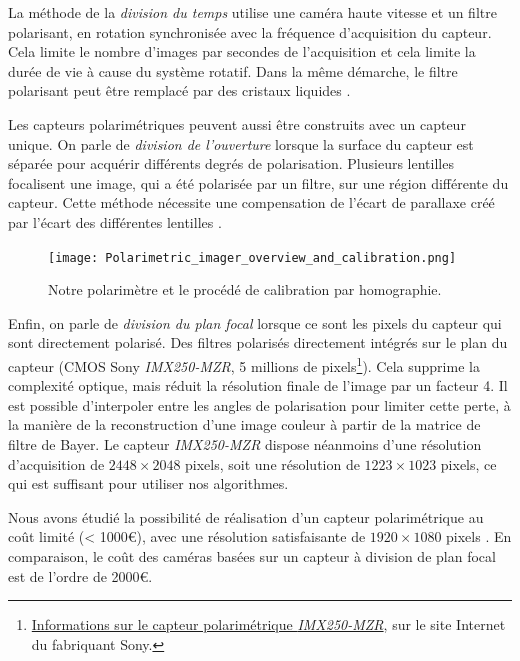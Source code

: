 La méthode de la \textit{division du temps} utilise une caméra haute vitesse et un filtre polarisant, en rotation synchronisée avec la fréquence d'acquisition du capteur.
Cela limite le nombre d'images par secondes de l'acquisition et cela limite la durée de vie à cause du système rotatif.
Dans la même démarche, le filtre polarisant peut être remplacé par des cristaux liquides \cite{gendre_full_2011}.

Les capteurs polarimétriques peuvent aussi être construits avec un capteur unique.
On parle de \textit{division de l'ouverture} lorsque la surface du capteur est séparée pour acquérir différents degrés de polarisation.
Plusieurs lentilles focalisent une image, qui a été polarisée par un filtre, sur une région différente du capteur.
Cette méthode nécessite une compensation de l'écart de parallaxe créé par l'écart des différentes lentilles \cite{riou_calibration_2015}.  %

\begin{figure}[bht]
	\centering
	\texttt{[image: Polarimetric\_imager\_overview\_and\_calibration.png]}
	\caption{Notre polarimètre et le procédé de calibration par homographie.}
	\label{fig:sensor}
\end{figure}

Enfin, on parle de \textit{division du plan focal} lorsque ce sont les pixels du capteur qui sont directement polarisé.
Des filtres polarisés directement intégrés sur le plan du capteur \cite{yamazaki_fourdirectional_2016} (CMOS Sony \textit{IMX250-MZR}, 5 millions de pixels\footnote{\href{https://www.sony-semicon.co.jp/products_en/IS/sensor5/index.html}{Informations sur le capteur polarimétrique \textit{IMX250-MZR}}, sur le site Internet du fabriquant Sony.}).
Cela supprime la complexité optique, mais réduit la résolution finale de l'image par un facteur 4.
Il est possible d'interpoler entre les angles de polarisation pour limiter cette perte, à la manière de la reconstruction d'une image couleur à partir de la matrice de filtre de Bayer.
Le capteur \textit{IMX250-MZR} dispose néanmoins d'une résolution d'acquisition de $2448\times 2048$ pixels, soit une résolution  de $1223\times 1023$ pixels, ce qui est suffisant pour utiliser nos algorithmes.

Nous avons étudié la possibilité de réalisation d'un capteur polarimétrique au coût limité (< 1000€), avec une résolution satisfaisante de $1920\times 1080$ pixels \cite{nagorny_polarimetric_2019}.
En comparaison, le coût des caméras basées sur un capteur à division de plan focal est de l'ordre de 2000€.

